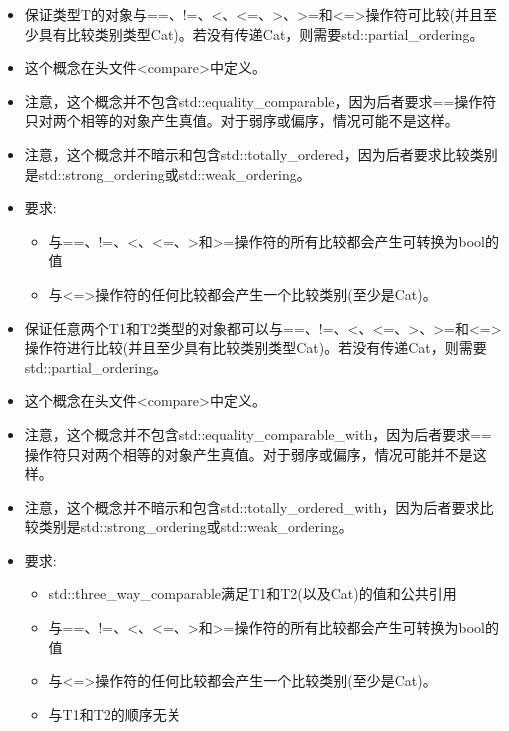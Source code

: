 

\begin{itemize}
\item
保证类型T的对象与==、!=、<、<=、>、>=和<=>操作符可比较(并且至少具有比较类别类型Cat)。若没有传递Cat，则需要std::partial\_ordering。

\item
这个概念在头文件<compare>中定义。

\item
注意，这个概念并不包含std::equality\_comparable，因为后者要求==操作符只对两个相等的对象产生真值。对于弱序或偏序，情况可能不是这样。

\item
注意，这个概念并不暗示和包含std::totally\_ordered，因为后者要求比较类别是std::strong\_ordering或std::weak\_ordering。

\item
要求:
\begin{itemize}
\item
与==、!=、<、<=、>和>=操作符的所有比较都会产生可转换为bool的值

\item
与<=>操作符的任何比较都会产生一个比较类别(至少是Cat)。
\end{itemize}
\end{itemize}


\begin{itemize}
\item
保证任意两个T1和T2类型的对象都可以与==、!=、<、<=、>、>=和<=>操作符进行比较(并且至少具有比较类别类型Cat)。若没有传递Cat，则需要std::partial\_ordering。

\item
这个概念在头文件<compare>中定义。

\item
注意，这个概念并不包含std::equality\_comparable\_with，因为后者要求==操作符只对两个相等的对象产生真值。对于弱序或偏序，情况可能并不是这样。

\item
注意，这个概念并不暗示和包含std::totally\_ordered\_with，因为后者要求比较类别是std::strong\_ordering或std::weak\_ordering。

\item
要求:
\begin{itemize}
\item
std::three\_way\_comparable满足T1和T2(以及Cat)的值和公共引用

\item
与==、!=、<、<=、>和>=操作符的所有比较都会产生可转换为bool的值

\item
与<=>操作符的任何比较都会产生一个比较类别(至少是Cat)。

\item
与T1和T2的顺序无关
\end{itemize}
\end{itemize}




